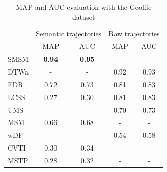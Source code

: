 \begin{table}[ht!]
  \scriptsize
  \centering
  \begin{tabular}{|l|c|c|c|c|}
  \hline
 & \multicolumn{2}{c}{Semantic trajectories}& \multicolumn{2}{|c|}{Raw trajectories}\\
 	\cline{2-5}
 & MAP & AUC & MAP & AUC\\
  	\hline
SMSM & \textbf{0.94} & \textbf{0.95} & - & -\\
DTWa & - & - & 0.92 & 0.93\\
 EDR & 0.72 & 0.73 & 0.81 & 0.83\\
LCSS & 0.27 & 0.30 & 0.81 & 0.83\\
 UMS & - & - & 0.70 & 0.73\\
 MSM & 0.66 & 0.68 & - & -\\
 wDF & - & - & 0.54 & 0.58\\
CVTI & 0.30 & 0.34 & - & -\\
MSTP & 0.28 & 0.32 & - & -\\
    \hline
  \end{tabular}
  \caption{MAP and AUC evaluation with the Geolife dataset}
  \label{tab:geolife_measures_map_auc}
\end{table}

